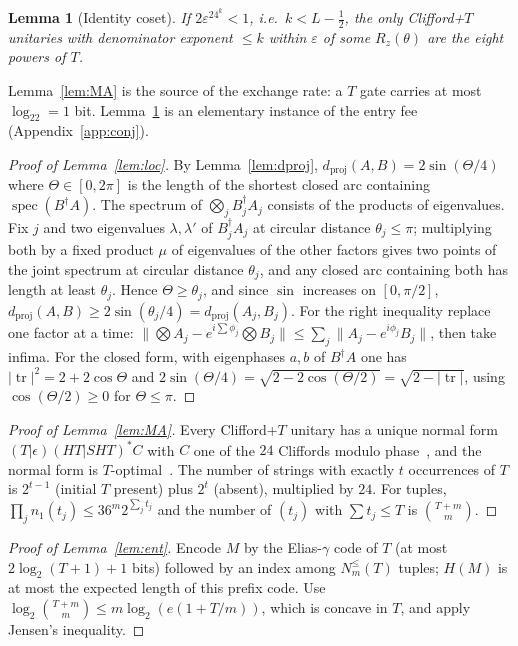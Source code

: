 \documentclass[aps,prx,twocolumn,superscriptaddress,nofootinbib,longbibliography]{revtex4-2}
\theoremstyle{plain}
\newtheorem{lemma}{Lemma}
\theoremstyle{definition}
\theoremstyle{remark}
\newcommand{\dproj}{d_{\mathrm{proj}}}
\newcommand{\tr}{\operatorname{tr}}
\DeclareMathOperator{\spec}{spec}
\begin{document}
\begin{lemma}[Identity coset]\label{lem:identity}
If $2\varepsilon^24^k<1$, i.e.\ $k<L-\tfrac12$, the only Clifford+$T$ unitaries with denominator exponent $\le k$ within $\varepsilon$ of some $R_z(\theta)$ are the eight powers of $T$.
\end{lemma}
Lemma~\ref{lem:MA} is the source of the exchange rate: a $T$ gate carries at most $\log_22=1$ bit. Lemma~\ref{lem:identity} is an elementary instance of the entry fee (Appendix~\ref{app:conj}).


\begin{proof}[Proof of Lemma~\ref{lem:loc}]
By Lemma~\ref{lem:dproj}, $\dproj(A,B)=2\sin(\Theta/4)$ where $\Theta\in[0,2\pi]$ is the length of the shortest closed arc containing $\spec(B^\dagger A)$. The spectrum of $\bigotimes_jB_j^\dagger A_j$ consists of the products of eigenvalues. Fix $j$ and two eigenvalues $\lambda,\lambda'$ of $B_j^\dagger A_j$ at circular distance $\theta_j\le\pi$; multiplying both by a fixed product $\mu$ of eigenvalues of the other factors gives two points of the joint spectrum at circular distance $\theta_j$, and any closed arc containing both has length at least $\theta_j$. Hence $\Theta\ge\theta_j$, and since $\sin$ increases on $[0,\pi/2]$, $\dproj(A,B)\ge2\sin(\theta_j/4)=\dproj(A_j,B_j)$. For the right inequality replace one factor at a time: $\|\bigotimes A_j-e^{i\sum\phi_j}\bigotimes B_j\|\le\sum_j\|A_j-e^{i\phi_j}B_j\|$, then take infima. For the closed form, with eigenphases $a,b$ of $B^\dagger A$ one has $|\tr|^2=2+2\cos\Theta$ and $2\sin(\Theta/4)=\sqrt{2-2\cos(\Theta/2)}=\sqrt{2-|\tr|}$, using $\cos(\Theta/2)\ge0$ for $\Theta\le\pi$.
\end{proof}

\begin{proof}[Proof of Lemma~\ref{lem:MA}]
Every Clifford+$T$ unitary has a unique normal form $(T|\epsilon)(HT|SHT)^*C$ with $C$ one of the $24$ Cliffords modulo phase~\cite{MA08}, and the normal form is $T$-optimal~\cite{KMM13}. The number of strings with exactly $t$ occurrences of $T$ is $2^{t-1}$ (initial $T$ present) plus $2^t$ (absent), multiplied by $24$. For tuples, $\prod_jn_1(t_j)\le36^m2^{\sum_jt_j}$ and the number of $(t_j)$ with $\sum t_j\le T$ is $\binom{T+m}{m}$.
\end{proof}

\begin{proof}[Proof of Lemma~\ref{lem:ent}]
Encode $M$ by the Elias-$\gamma$ code of $T$ (at most $2\log_2(T+1)+1$ bits) followed by an index among $N^{\le}_m(T)$ tuples; $H(M)$ is at most the expected length of this prefix code. Use $\log_2\binom{T+m}{m}\le m\log_2(e(1+T/m))$, which is concave in $T$, and apply Jensen's inequality.
\end{proof}
\end{document}
